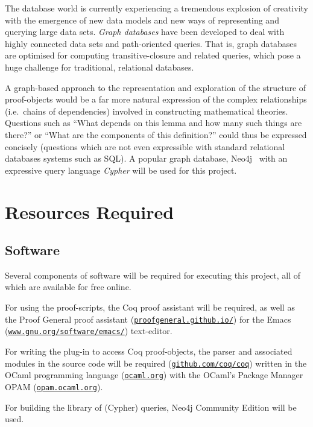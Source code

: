 \documentclass[12pt,a4paper]{article}
\begin{document}
The database world is currently experiencing a tremendous explosion of creativity
with the emergence of new data models and new ways of representing and querying
large data sets. \emph{Graph databases} have been developed to deal with highly
connected data sets and path-oriented queries. That is, graph databases are
optimised for computing transitive-closure and related queries, which pose a
huge challenge for traditional, relational databases.

A graph-based approach to the representation and exploration of the structure of
proof-objects would	be a far more natural expression of the complex
relationships (i.e.\ chains of dependencies) involved in
constructing mathematical theories. Questions such as ``What depends on this
lemma and how many such things are there?'' or ``What are the components of
this definition?'' could thus be expressed concisely (questions which are not
even expressible with standard relational databases systems such as
SQL). A popular graph database, Neo4j~\cite{neo4j} with an expressive query
language \emph{Cypher} will be used for this project.
	
\section*{Resources Required}

\subsection*{Software}
Several components of software will be required for executing this project, all
of which are available for free online.

For using the proof-scripts, the Coq proof assistant will be required, as well
as the Proof General proof assistant
(\href{http://proofgeneral.github.io/}{\texttt{proofgeneral.github.io/}}) for the Emacs
(\href{http://www.gnu.org/software/emacs/}{\texttt{www.gnu.org/software/emacs/}})
text-editor.

For writing the plug-in to access Coq proof-objects, the parser and associated
modules in the source code will be required
(\href{http://github.com/coq/coq}{\texttt{github.com/coq/coq}}) written in the OCaml
programming language (\href{http://ocaml.org}{\texttt{ocaml.org}}) with the OCaml's
Package Manager OPAM (\href{http://opam.ocaml.org}{\texttt{opam.ocaml.org}}).

For building the library of (Cypher) queries, Neo4j Community Edition will be
used.
\end{document}
